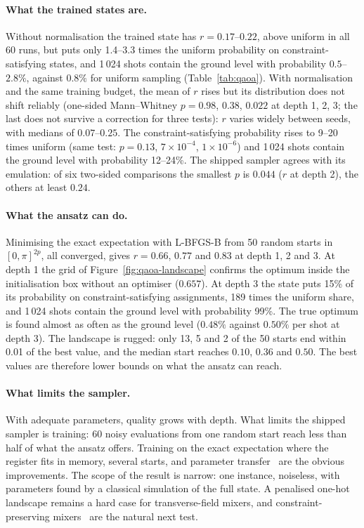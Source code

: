 \documentclass[11pt,a4paper]{article}
\begin{document}
\paragraph{What the trained states are.} Without normalisation the trained
state has $r = 0.17$--$0.22$, above uniform in all 60 runs, but puts only
1.4--3.3 times the uniform probability on constraint-satisfying states, and
1\,024 shots contain the ground level with probability $0.5$--$2.8\%$,
against $0.8\%$ for uniform sampling (Table~\ref{tab:qaoa}). With
normalisation and the same training budget, the mean of $r$ rises but its
distribution does not shift reliably (one-sided Mann--Whitney $p = 0.98$,
$0.38$, $0.022$ at depth 1, 2, 3; the last does not survive a correction for
three tests): $r$ varies widely between seeds, with medians of
$0.07$--$0.25$. The constraint-satisfying probability rises
to 9--20 times uniform (same test: $p = 0.13$, $7\times10^{-4}$,
$1\times10^{-6}$) and
1\,024 shots contain the ground level with probability 12--24\%. The shipped
sampler agrees with
its emulation: of six two-sided comparisons the smallest $p$ is $0.044$ ($r$
at depth 2), the others at least $0.24$.

\paragraph{What the ansatz can do.} Minimising the exact expectation with
L-BFGS-B from 50 random starts in $[0,\pi]^{2p}$, all converged, gives
$r = 0.66$, $0.77$ and $0.83$ at depth 1, 2 and 3. At depth 1 the grid of
Figure~\ref{fig:qaoa-landscape} confirms the optimum inside the
initialisation box without an optimiser ($0.657$). At depth 3 the state puts
15\% of its probability on constraint-satisfying assignments, 189 times the
uniform share, and 1\,024 shots contain the ground level with probability
99\%. The true optimum is found almost as often as the ground level
($0.48\%$ against $0.50\%$ per shot at depth 3). The landscape is rugged:
only 13, 5 and 2 of the 50 starts end within 0.01 of the best value, and
the median start reaches $0.10$, $0.36$ and $0.50$. The best values are
therefore lower bounds on what the ansatz can reach.

\paragraph{What limits the sampler.} With adequate parameters, quality
grows with depth. What limits the
shipped sampler is training: 60 noisy evaluations from one random start
reach less than half of what the ansatz offers. Training on the exact
expectation where the register fits in memory, several starts, and parameter
transfer~\cite{shaydulin2023} are the obvious improvements. The scope of the
result is narrow: one instance, noiseless, with parameters found by a
classical simulation of the full state. A penalised one-hot landscape
remains a hard case for transverse-field mixers, and constraint-preserving
mixers~\cite{hadfield2019} are the natural next test.
\end{document}
